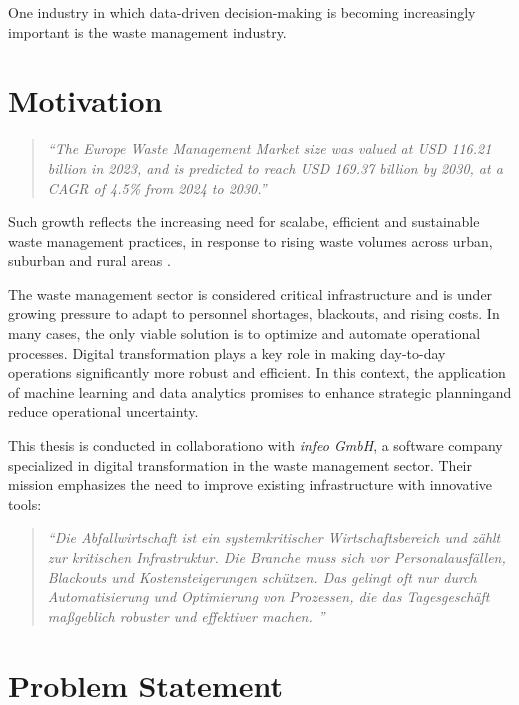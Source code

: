\documentclass[a4paper,12pt,twoside]{scrreprt}
\begin{document}
One industry in which data-driven decision-making is becoming increasingly
important is the
waste management industry.

\section{Motivation}
\begin{quote}
  \textit{
    ``The Europe Waste Management Market size was valued at USD 116.21
    billion in
    2023, and is predicted to reach USD 169.37 billion by 2030, at a CAGR of
    4.5\% from 2024 to 2030.''\cite{noauthor_europe_nodate}}
\end{quote}

Such growth reflects the increasing need for scalabe, efficient and sustainable
waste
management practices, in response to rising waste volumes across urban,
suburban and rural areas \cite{noauthor_solid_nodate}.

The waste management sector is considered critical infrastructure and is under
growing pressure to adapt to personnel shortages, blackouts, and rising costs.
In many cases, the only viable solution is to optimize and automate operational
processes. Digital transformation plays a key role in making day-to-day
operations significantly more robust and
efficient.\cite{noauthor_gemeinsam_nodate}
In this context, the application of machine learning and data analytics
promises to enhance strategic planningand reduce operational uncertainty.

This thesis is conducted in collaborationo with \textit{infeo GmbH}, a software
company specialized in digital transformation in the waste management
sector. Their mission emphasizes the need to improve existing infrastructure
with innovative tools:

\begin{quotation}
  \textit{
    ``Die Abfallwirtschaft ist ein systemkritischer Wirtschaftsbereich und
    zählt
    zur kritischen Infrastruktur. Die Branche muss sich vor Personalausfällen,
    Blackouts und Kostensteigerungen schützen. Das gelingt oft nur durch
    Automatisierung und Optimierung von Prozessen, die das Tagesgeschäft
    maßgeblich robuster und effektiver machen.
    ''\cite{noauthor_gemeinsam_nodate}}
\end{quotation}

\section{Problem Statement}
\end{document}
